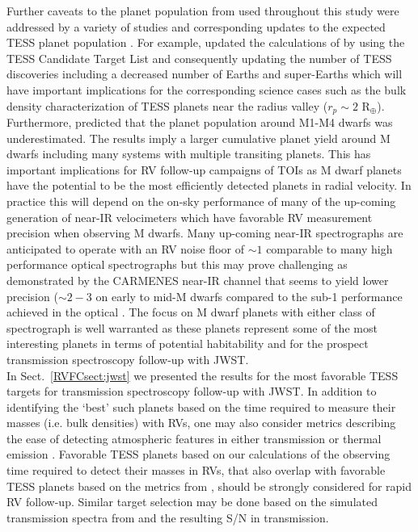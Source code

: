 Further caveats to the planet population from  used throughout this study were
addressed by a variety of studies and corresponding updates to the expected TESS planet population
\citep[e.g.][]{ballard18,barclay18}. 
For example, \cite{barclay18} updated
the calculations of  by using the TESS Candidate Target List \citep{stassun17}
and consequently updating the number of TESS discoveries including a decreased number of Earths and
super-Earths which will have important implications for the corresponding science cases such as
the bulk density characterization of TESS planets near the radius valley ($r_p \sim 2$ R$_{\oplus}$).
Furthermore, \cite{ballard18} predicted that the planet population around M1-M4 dwarfs was
underestimated. The results imply a larger cumulative planet yield around M dwarfs including many
systems with multiple transiting planets. This has important implications for RV follow-up campaigns
of TOIs as M dwarf planets have the potential to be the most efficiently detected planets in radial velocity.
In practice this will depend on the on-sky performance of many of the up-coming generation of near-IR
velocimeters which have favorable RV measurement precision when observing M dwarfs.
Many up-coming near-IR spectrographs are anticipated to operate with an RV noise floor of $\sim 1$
\mps{} comparable to many high performance optical spectrographs but this may prove
challenging as demonstrated by the CARMENES near-IR channel that seems to yield lower precision
($\sim 2-3$ \mps{)} on early to mid-M dwarfs compared to the sub-1 \mps{} performance achieved in the
optical \citep[][c.f. Fig 6]{reiners18}.
The focus on M dwarf planets with either class of spectrograph is well warranted as these planets
represent some of the most interesting planets in terms of potential habitability and for the
prospect transmission spectroscopy follow-up with JWST. \\

In Sect.~\ref{RVFCsect:jwst} we presented the results for the most favorable TESS targets for
transmission spectroscopy follow-up with JWST. In addition to identifying the `best' such planets
based on the time required to measure their masses (i.e. bulk densities) with RVs,
one may also consider metrics
describing the ease of detecting atmospheric features in either transmission or thermal emission
\citep[e.g.][]{kempton18,morgan18}. Favorable TESS planets based on our calculations of
the observing time required to detect their masses in RVs, that also overlap with favorable TESS planets
based on the metrics from \cite{kempton18}, should be strongly considered for rapid RV follow-up.
Similar target selection may be done based on the simulated transmission spectra from \cite{louie18}
and the resulting S/N in transmission. \\

